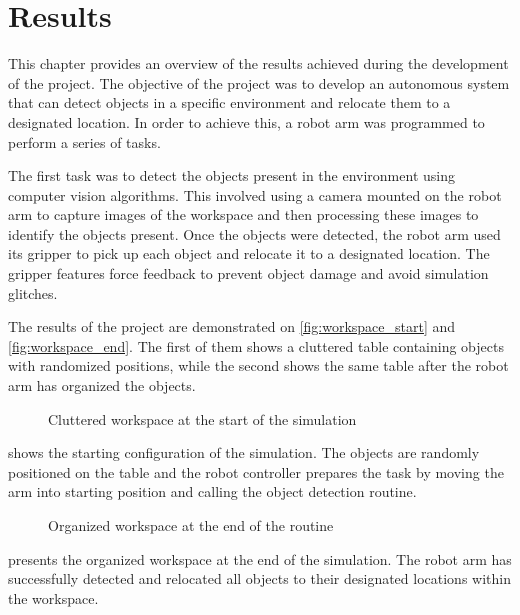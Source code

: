 
\chapter{Results} %
\label{results} %



This chapter provides an overview of the results achieved during the development of the project. The objective of the project was to develop an autonomous system that can detect objects in a specific environment and relocate them to a designated location. In order to achieve this, a robot arm was programmed to perform a series of tasks. 

The first task was to detect the objects present in the environment using computer vision algorithms. This involved using a camera mounted on the robot arm to capture images of the workspace and then processing these images to identify the objects present. Once the objects were detected, the robot arm used its gripper to pick up each object and relocate it to a designated location. The gripper features force feedback to prevent object damage and avoid simulation glitches.

The results of the project are demonstrated on \vref{fig:workspace_start} and \vref{fig:workspace_end}. The first of them shows a cluttered table containing objects with randomized positions, while the second shows the same table after the robot arm has organized the objects.

\begin{figure}[!h]
    \centering
    \caption{Cluttered workspace at the start of the simulation }
    \label{fig:workspace_start}
\end{figure}

 shows the starting configuration of the simulation. The objects are randomly positioned on the table and the robot controller prepares the task by moving the arm into starting position and calling the object detection routine.

\begin{figure}[!h]
    \centering
    \caption{Organized workspace at the end of the routine }
    \label{fig:workspace_end}
\end{figure}

 presents the organized workspace at the end of the simulation. The robot arm has successfully detected and relocated all objects to their designated locations within the workspace.

